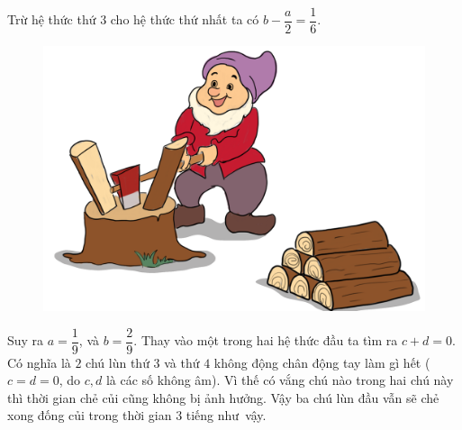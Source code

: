 \begin{multicols}{2}
	Trừ hệ thức thứ $3$ cho hệ thức thứ nhất ta có $b-\dfrac{a}{2}=\dfrac{1}{6}$.
	\begin{figure}[H]
		\vspace*{-5pt}
		\centering
		\captionsetup{labelformat= empty, justification=centering}
		\includegraphics[width= 1\linewidth]{b6}
		\vspace*{-15pt}
	\end{figure}
	Suy ra $a= \dfrac{1}{9}$, và $b=\dfrac{2}{9}$. Thay vào một trong hai hệ thức đầu ta tìm ra $c+d=0$. Có nghĩa là $2$ chú lùn thứ $3$ và thứ $4$ không động chân động tay làm gì hết ($c=d=0$, do $c,d$ là các số không âm).
	Vì thế có vắng chú nào trong hai chú này thì thời gian chẻ củi cũng không bị ảnh hưởng. Vậy ba chú lùn đầu vẫn sẽ  chẻ xong đống củi trong thời gian $3$ tiếng như~vậy.
\end{multicols}
\newpage
\begingroup
\thispagestyle{toancuabinone}
